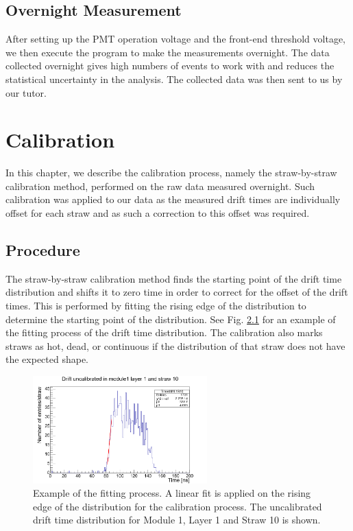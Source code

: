 \documentclass[a4paper]{report}
\numberwithin{equation}{section}
\begin{document}
\section{Overnight Measurement}

After setting up the PMT operation voltage and the front-end threshold voltage, we then execute the program to make the measurements overnight. The data collected overnight gives high numbers of events to work with and reduces the statistical uncertainty in the analysis. The collected data was then sent to us by our tutor. 



\chapter{Calibration} \label{chap:calib}

In this chapter, we describe the calibration process, namely the straw-by-straw calibration method, performed 
on the raw data measured overnight. Such calibration was applied to our data as the measured drift times 
are individually offset for each straw and as such a correction to this offset was required.

\section{Procedure} \label{sec:calib_proc}

The straw-by-straw calibration method finds the starting point of the drift time distribution and shifts it to 
zero time in order to correct for the offset of the drift times. This is performed by fitting the rising edge of the 
distribution to determine the starting point of the distribution. See Fig. \ref{fig:calib_drift_fit} for an example of the fitting process of the 
drift time distribution. The calibration also marks straws as hot, dead, or continuous if the distribution of that straw 
does not have the expected shape. \par 

\begin{figure}[!h]
	\centering
	\includegraphics[width=0.6\textwidth]{calib_drift_m1l1s10_fit.png}
	\caption{Example of the fitting process. A linear fit is applied on the rising edge of the distribution for the calibration process. The uncalibrated drift time distribution
	 for Module 1, Layer 1 and Straw 10 is shown. }
	\label{fig:calib_drift_fit}
\end{figure}
\end{document}
